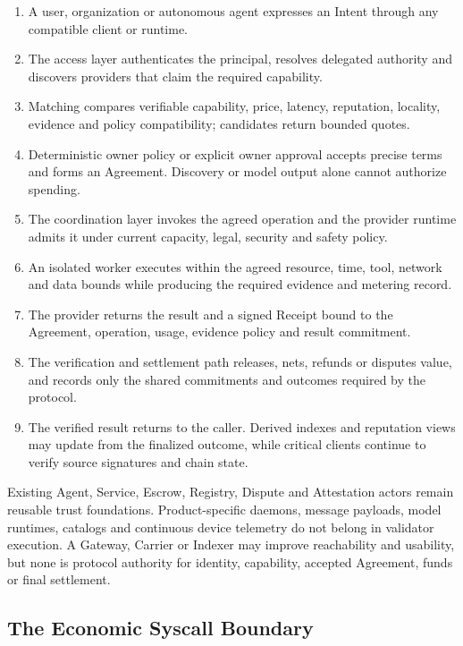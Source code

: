 \documentclass[11pt,oneside]{article}
\begin{document}
\begin{enumerate}
  \item A user, organization or autonomous agent expresses an Intent through any compatible
        client or runtime.
  \item The access layer authenticates the principal, resolves delegated authority and
        discovers providers that claim the required capability.
  \item Matching compares verifiable capability, price, latency, reputation, locality,
        evidence and policy compatibility; candidates return bounded quotes.
  \item Deterministic owner policy or explicit owner approval accepts precise terms and forms
        an Agreement. Discovery or model output alone cannot authorize spending.
  \item The coordination layer invokes the agreed operation and the provider runtime admits
        it under current capacity, legal, security and safety policy.
  \item An isolated worker executes within the agreed resource, time, tool, network and data
        bounds while producing the required evidence and metering record.
  \item The provider returns the result and a signed Receipt bound to the Agreement,
        operation, usage, evidence policy and result commitment.
  \item The verification and settlement path releases, nets, refunds or disputes value, and
        records only the shared commitments and outcomes required by the protocol.
  \item The verified result returns to the caller. Derived indexes and reputation views may
        update from the finalized outcome, while critical clients continue to verify source
        signatures and chain state.
\end{enumerate}

Existing Agent, Service, Escrow, Registry, Dispute and Attestation actors remain reusable
trust foundations. Product-specific daemons, message payloads, model runtimes, catalogs and
continuous device telemetry do not belong in validator execution. A Gateway, Carrier or
Indexer may improve reachability and usability, but none is protocol authority for identity,
capability, accepted Agreement, funds or final settlement.

\subsection{The Economic Syscall Boundary}
\end{document}

